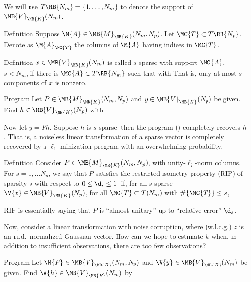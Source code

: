 We will use \(T \RB{N_m} =\{1, \dotsc, N_m\}\) to denote the support of \(\MB{V}_{\MB{K}} (N_m)\).

\Result
{Definition}
{
Suppose \(\M{A} \in \MB{M}_{\MB{K}} (N_m, N_p)\).
Let \(\MC{T} \subset T \RB{N_p}\).
Denote as \(\M{A}_{\MC{T}}\) the columns of \(\M{A}\) having indices in \(\MC{T}\).
}

\Result
{Definition}
{
   \(x \in \MB{V}_{\MB{K}} (N_m)\) is called \(s\)-sparse with support \(\MC{A}\), \(s <N_m\), if there is \(\MC{A} \subset T \RB{N_m}\) such that
%
with
That is, only at most \(s\) components of \(x\) is nonzero.
}

\Result
{Program}
{
Let \(P \in \MB{M}_\MB{K} (N_m, N_p)\) and \(y \in \MB{V}_\MB{K} (N_p)\) be given.
Find \(h \in \MB{V}_\MB{K} (N_p)\) with
%
}

Now let \(y =P h\).
Suppose \(h\) is \(s\)-sparse, then the program () completely recovers \(h\).
That is, a noiseless linear transformation of a sparse vector is completely recovered by a \(\ell_1\)-minization program with an overwhelming probability.

\Result
{Definition}
{
Consider \(P \in \MB{M}_{\MB{K}} (N_m, N_p)\), with unity-\(\ell_2\)-norm columns.
For \(s =1, \dotsc N_p\), we say that \(P\) satisfies the restricted isometry property (RIP) of sparsity \(s\) with respect to \(0 \leq \d_s \leq 1\), if, for all \(s\)-sparse \(\V{x} \in \MB{V}_{\MB{K}} (N_p)\), for all \(\MC{T} \subset T(N_m)\) with \(\#\{\MC{T}\} \leq s\),
%
}

RIP is essentially saying that \(P\) is ``almost unitary'' up to ``relative error'' \(\d_s\).

Now, consider a linear transformation with noise corruption,
%
%
where (w.l.o.g.) \(z\) is an i.i.d.\ normalized Gaussian vector.
How can we hope to estimate \(h\) when, in addition to insufficient observations, there are too few observations?

\Result
{Program}
{
Let \(\M{P} \in \MB{V}_\MB{R} (N_m, N_p)\) and \(\V{y} \in \MB{V}_\MB{R} (N_m)\) be given.
Find \(\V{h} \in \MB{V}_\MB{R} (N_m)\) by
%
}

